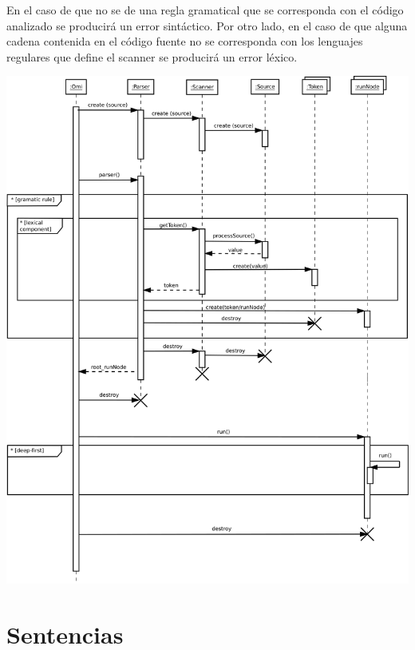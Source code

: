 En el caso de que no se de una regla gramatical que se corresponda con el código analizado se 
producirá un error sintáctico. Por otro lado, en el caso de que alguna cadena contenida
en el código fuente no se corresponda con los lenguajes regulares que define el scanner
se producirá un error léxico.


\begin{center}
\includegraphics[scale=0.32]{interaction.png} \\
\end{center}

\section{Sentencias}
